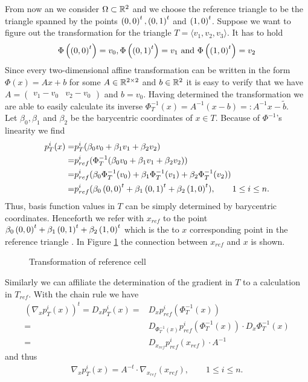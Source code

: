 \begin{definition} 
\begin{example}\label{ex: base cell trafo}
From now an we consider $\Omega \subset \mathbb{R}^2$ and we choose the reference triangle to be the triangle spanned by the points $\left( 0, 0\right)^t, \left( 0, 1\right)^t$ and $\left( 1, 0\right)^t$.
Suppose we want to figure out the transformation for the triangle $T = \langle v_1,v_2,v_3 \rangle$.
It has to hold
\[
\Phi\left(\left( 0, 0\right)^t\right) = v_0, \Phi\left(\left( 0, 1\right)^t\right) = v_1 \textnormal{ and } \Phi\left(\left( 1, 0\right)^t\right) = v_2
\]
Since every two-dimensional affine transformation can be written in the form $\Phi(x) = Ax+b$ for some $A \in \mathbb{R}^{2 \times 2}$ and $b \in \mathbb{R}^2$ it is easy to verify that we have $A = \begin{pmatrix} v_1-v_0 & v_2-v_0\end{pmatrix}$ and $b = v_0$.
Having determined the transformation we are able to easily calculate its inverse $\Phi_T^{-1}(x) = A^{-1} (x-b) =: A^{-1} x- \tilde b$. \\
Let $\beta_0, \beta_1$ and $\beta_2$ be the barycentric coordinates of $x \in T$. Because of $\Phi^{-1}$'s linearity we find
\begin{align*}
	p^i_T(x) =& p_T^i( \beta_0 v_0 +\beta_1 v_1 + \beta_2 v_2  ) \\
	=& p^i_{ref}(\Phi_T^{-1}(\beta_0 v_0 +\beta_1 v_1 + \beta_2 v_2)) \\
	=& p^i_{ref}(\beta_0 \Phi_T^{-1}(v_0) +\beta_1 \Phi_T^{-1}(v_1) + \beta_2 \Phi_T^{-1}(v_2)) \\
		=& p^i_{ref}(\beta_0 \left( 0, 0\right)^t +\beta_1 \left( 0, 1\right)^t + \beta_2 \left( 1, 0\right)^t ), \qquad 1 \leq i \leq n.
\end{align*}
Thus, basis function values in $T$ can be simply determined by barycentric coordinates. Henceforth we refer with $x_{ref}$  to the point $\beta_0 \left( 0, 0\right)^t +\beta_1 \left( 0, 1\right)^t + \beta_2 \left( 1, 0\right)^t$ which is the to $x$ corresponding point in the reference triangle . In Figure \ref{fig: transformation} the connection between $x_{ref}$ and $x$ is shown.

\begin{figure}[!h]
	
	\caption{Transformation of reference cell}
	 \label{fig: transformation}
\end{figure}

Similarly we can affiliate the determination of the gradient in $T$ to a calculation in $T_{ref}$. With the chain rule we have
\begin{align*}
	\left(\nabla_x p_T^i(x)\right)^t = D_x p_T^i(x) =& D_x p^i_{ref}(\Phi_T^{-1}(x)) \\
	  =& D_{\Phi_T^{-1}(x)}p^i_{ref}(\Phi_T^{-1}(x)) \cdot D_x  \Phi_T^{-1}(x) \\
	  =& D_{x_{ref}}p^i_{ref}(x_{ref}) \cdot  A^{-1}
\end{align*}
and thus
\begin{align}
	\nabla_x p_T^i(x) = A^{-t} \cdot \nabla_{x_{ref}}(x_{ref}), \qquad 1 \leq i \leq n. \label{eq: ref gradient}
\end{align}


\end{example}
\end{definition}
